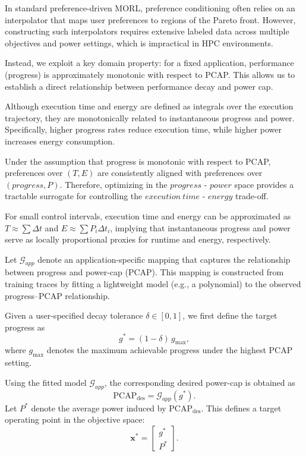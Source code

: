In standard preference-driven MORL, preference conditioning often relies on an interpolator that maps user preferences to regions of the Pareto front. However, constructing such interpolators requires extensive labeled data across multiple objectives and power settings, which is impractical in HPC environments.

Instead, we exploit a key domain property: for a fixed application, performance (progress) is approximately monotonic with respect to PCAP. This allows us to establish a direct relationship between performance decay and power cap.

Although execution time and energy are defined as integrals over the execution trajectory, they are monotonically related to instantaneous progress and power. Specifically, higher progress rates reduce execution time, while higher power increases energy consumption.

Under the assumption that progress is monotonic with respect to PCAP, preferences over $(T, E)$ are consistently aligned with preferences over $(progress, P)$. Therefore, optimizing in the $progress$ - $power$ space provides a tractable surrogate for controlling the $execution\ time$ - $energy$ trade-off.

For small control intervals, execution time and energy can be approximated as
$T \approx \sum \Delta t$ and $E \approx \sum P_i \Delta t_i$, implying that
instantaneous progress and power serve as locally proportional proxies for
runtime and energy, respectively.

Let $\mathcal{G}_{app}$ denote an application-specific mapping that captures the relationship between progress and power-cap (PCAP). This mapping is constructed from training traces by fitting a lightweight model (e.g., a polynomial) to the observed progress--PCAP relationship.

Given a user-specified decay tolerance $\delta \in [0,1]$, we first define the target progress as
\begin{equation}
g^* = (1-\delta)\, g_{\max},
\end{equation}
where $g_{\max}$ denotes the maximum achievable progress under the highest PCAP setting.

Using the fitted model $\mathcal{G}_{app}$, the corresponding desired power-cap is obtained as
\begin{equation}
\text{PCAP}_{\text{des}} = \mathcal{G}_{app}(g^*).
\end{equation}
Let $P^*$ denote the average power induced by $\text{PCAP}_{\text{des}}$. This defines a target operating point in the objective space:
\begin{equation}
\mathbf{x}^* =
\begin{bmatrix}
g^* \\
P^*
\end{bmatrix}.
\end{equation}

